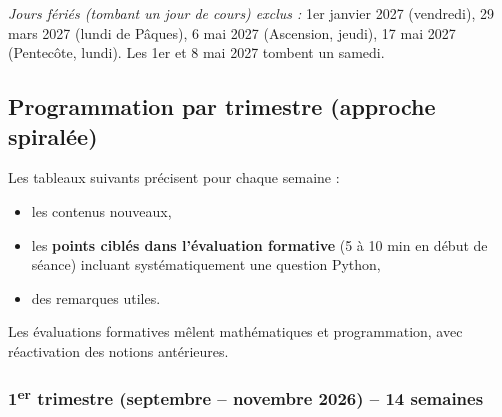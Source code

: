 \documentclass[a4paper,12pt]{article}
\begin{document}
	\textit{Jours fériés (tombant un jour de cours) exclus :} 1er janvier 2027 (vendredi), 29 mars 2027 (lundi de Pâques), 6 mai 2027 (Ascension, jeudi), 17 mai 2027 (Pentecôte, lundi). Les 1er et 8 mai 2027 tombent un samedi.
	
	\subsection{Programmation par trimestre (approche spiralée)}
	Les tableaux suivants précisent pour chaque semaine :
	\begin{itemize}
		\item les contenus nouveaux,
		\item les \textbf{points ciblés dans l’évaluation formative} (5 à 10 min en début de séance) incluant systématiquement une question Python,
		\item des remarques utiles.
	\end{itemize}
	Les évaluations formatives mêlent mathématiques et programmation, avec réactivation des notions antérieures.
	
	\newpage
	\subsubsection{1\textsuperscript{er} trimestre (septembre – novembre 2026) – 14 semaines}
	
\end{document}
